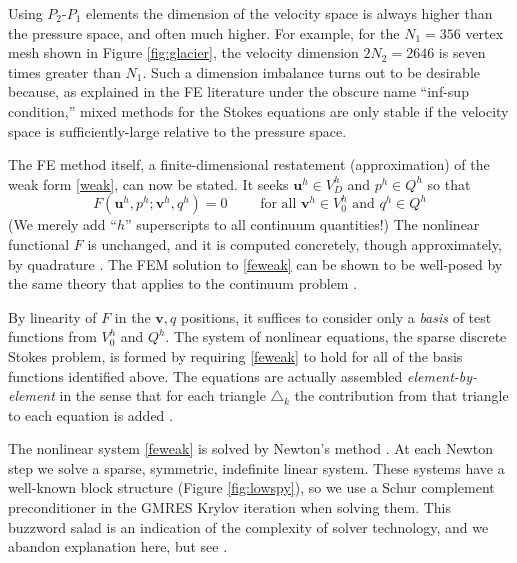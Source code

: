\documentclass[letterpaper,final,12pt,reqno]{amsart}
\newcommand{\bu}{\mathbf{u}}
\newcommand{\bv}{\mathbf{v}}
\begin{document}
Using $P_2$-$P_1$ elements the dimension of the velocity space is always higher than the pressure space, and often much higher.  For example, for the $N_1=356$ vertex mesh shown in Figure \ref{fig:glacier}, the velocity dimension $2N_2=2646$ is seven times greater than $N_1$.  Such a dimension imbalance turns out to be desirable because, as explained in the FE literature \cite{Braess2007,Elmanetal2014} under the obscure name ``inf-sup condition,'' mixed methods for the Stokes equations are only stable if the velocity space is sufficiently-large relative to the pressure space.

The FE method itself, a finite-dimensional restatement (approximation) of the weak form \eqref{weak}, can now be stated.  It seeks $\bu^h \in V_D^h$ and $p^h \in Q^h$ so that
\begin{equation}
F(\bu^h,p^h;\bv^h,q^h) = 0 \qquad \text{ for all } \bv^h\in V_0^h \text{ and } q^h\in Q^h  \label{feweak}
\end{equation}
(We merely add ``$h$'' superscripts to all continuum quantities!)  The nonlinear functional $F$ is unchanged, and it is computed concretely, though approximately, by quadrature \cite{BuelerBook,Elmanetal2014}.  The FEM solution to \eqref{feweak} can be shown to be well-posed by the same theory that applies to the continuum problem \cite[Theorem 4.3]{JouvetRappaz2011}.

By linearity of $F$ in the $\bv,q$ positions, it suffices to consider only a \emph{basis} of test functions from $V_0^h$ and $Q^h$.  The system of nonlinear equations, the sparse discrete Stokes problem, is formed by requiring \eqref{feweak} to hold for all of the basis functions identified above.  The equations are actually assembled \emph{element-by-element} in the sense that for each triangle $\triangle_k$ the contribution from that triangle to each equation is added \cite[chapter 9]{BuelerBook}.

The nonlinear system \eqref{feweak} is solved by Newton's method \cite{Kelley2003}.  At each Newton step we solve a sparse, symmetric, indefinite linear system.  These systems have a well-known block structure (Figure \ref{fig:lowspy}), so we use a Schur complement preconditioner in the GMRES Krylov iteration \cite{Elmanetal2014,GolubVanLoan2013} when solving them.  This buzzword salad is an indication of the complexity of solver technology, and we abandon explanation here, but see \cite{BuelerBook}.
\end{document}
